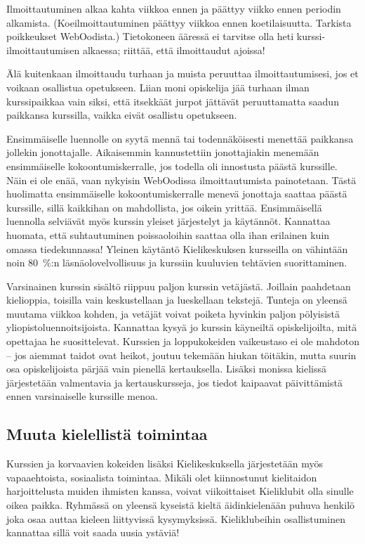\documentclass[a5paper, 8pt, twocolumn]{book} %
\numberwithin{equation}{section}
\begin{document}
Ilmoittautuminen alkaa kahta viikkoa
ennen ja päättyy viikko ennen periodin
alkamista. (Koeilmoittautuminen päättyy
viikkoa ennen koetilaisuutta. Tarkista poikkeukset
WebOodista.) Tietokoneen ääressä
ei tarvitse olla heti kurssi-ilmoittautumisen
alkaessa; riittää, että ilmoittaudut ajoissa!

Älä kuitenkaan ilmoittaudu turhaan ja
muista peruuttaa ilmoittautumisesi, jos et
voikaan osallistua opetukseen. Liian moni
opiskelija jää turhaan ilman kurssipaikkaa vain siksi, että itsekkäät jurpot jättävät
peruuttamatta saadun paikkansa kurssilla,
vaikka eivät osallistu opetukseen.

Ensimmäiselle luennolle on syytä mennä
tai todennäköisesti menettää paikkansa
jollekin jonottajalle. Aikaisemmin kannustettiin
jonottajiakin menemään ensimmäiselle
kokoontumiskerralle, jos todella oli
innostusta päästä kurssille. Näin ei ole enää,
vaan nykyisin WebOodissa ilmoittautumista
painotetaan. Tästä huolimatta ensimmäiselle
kokoontumiskerralle menevä jonottaja
saattaa päästä kurssille, sillä kaikkihan
on mahdollista, jos oikein yrittää. Ensimmäisellä
luennolla selviävät myös kurssin
yleiset järjestelyt ja käytännöt. Kannattaa
huomata, että suhtautuminen poissaoloihin
saattaa olla ihan erilainen kuin omassa
tiedekunnassa! Yleinen käytäntö Kielikeskuksen
kursseilla on vähintään noin 80~\%:n
läsnäolovelvollisuus ja kurssiin kuuluvien
tehtävien suorittaminen.

Varsinainen kurssin sisältö riippuu paljon
kurssin vetäjästä. Joillain paahdetaan
kielioppia, toisilla vain keskustellaan ja
lueskellaan tekstejä. Tunteja on yleensä
muutama viikkoa kohden, ja vetäjät voivat
poiketa hyvinkin paljon pölyisistä yliopistoluennoitsijoista.
Kannattaa kysyä jo kurssin
käyneiltä opiskelijoilta, mitä opettajaa
he suosittelevat. Kurssien ja loppukokeiden
vaikeustaso ei ole mahdoton -- jos aiemmat
taidot ovat heikot, joutuu tekemään hiukan
töitäkin, mutta suurin osa opiskelijoista
pärjää vain pienellä kertauksella. Lisäksi
monissa kielissä järjestetään valmentavia
ja kertauskursseja, jos tiedot kaipaavat
päivittämistä ennen varsinaiselle kurssille
menoa.

\subsection*{Muuta kielellistä toimintaa}
Kurssien ja korvaavien kokeiden lisäksi
Kielikeskuksella järjestetään myös vapaaehtoista,
sosiaalista toimintaa. Mikäli
olet kiinnostunut kielitaidon harjoittelusta
muiden ihmisten kanssa, voivat viikoittaiset
Kieliklubit olla sinulle oikea paikka.
Ryhmässä on yleensä kyseistä kieltä äidinkielenään
puhuva henkilö joka osaa auttaa
kieleen liittyvissä kysymyksissä. Kieliklubeihin
osallistuminen kannattaa sillä voit
saada uusia ystäviä!
\end{document}
